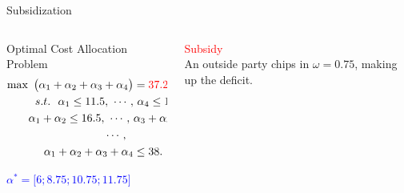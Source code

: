 \documentclass[14pt]{beamer}
\begin{document}
\begin{frame}{Subsidization}
\small
\vspace{-4mm}
\begin{columns}

\begin{column}{6.5cm}
\footnotesize
\vspace{-1em}
\begin{shaded}
\centering
Optimal Cost Allocation Problem
\begin{eqnarray*}
\begin{aligned}
\max ~\big(\alpha_1 + \alpha_2 + \alpha_3 + \alpha_4\big) &= \textcolor{red}{37.25 < 38}\\
s.t.~~ \alpha_1 \leq 11.5,~\cdots,&~\alpha_4 \leq 14.5,\\
\alpha_1 + \alpha_2 \leq 16.5,~\cdots,~ &\alpha_3+\alpha_4 \leq 22.5,\\
~~~~~~~~~~\cdots,~~&\\
\alpha_1 + \alpha_2 + \alpha_3 + \alpha_4 &\leq 38.
\end{aligned}
\end{eqnarray*}
\vspace{-0.5em}
\end{shaded}
\begin{shaded}
\centering
\textcolor{blue}{
$\alpha^* = \big[6;8.75;10.75;11.75\big]$}
\end{shaded}
\end{column}

\begin{column}{4.5cm}
\small
\centering

\textcolor{red}{Subsidy}\\
\vspace{2em}
An outside party chips in $\omega=0.75$, making up the deficit.

\end{column}

\end{columns}
\end{frame}
\end{document}
